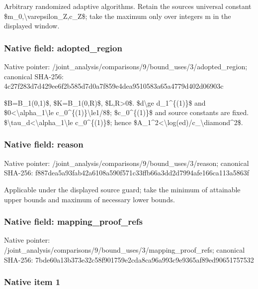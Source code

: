 \documentclass[10pt,a4paper]{article}
\begin{document}
Arbitrary randomized adaptive algorithms. Retain the sources universal constant \$m\_0,\textbackslash{}varepsilon\_Z,c\_Z\$; take the maximum only over integers m in the displayed window.


\subsubsection{Native field: adopted\_region}


Native pointer: /joint\_analysis/comparis\allowbreak{}ons/9/bound\_uses/3/adopt\allowbreak{}ed\_region; canonical SHA-256: 4c27f283d7d429ee6f2b585d\allowbreak{}7d0a7f859e4dea9510583a65\allowbreak{}a4779d402d06903c


\$B=B\_1(0,1)\$, \$K=B\_1(0,R)\$, \$L,R>0\$. \$d\textbackslash{}ge d\_1\textasciicircum{}\{(1)\}\$ and \$0<\textbackslash{}alpha\_1\textbackslash{}le c\_0\textasciicircum{}\{(1)\}\textbackslash{}le1/8\$; \$c\_0\textasciicircum{}\{(1)\}\$ and source constants are fixed. \$\textbackslash{}tau\_d<\textbackslash{}alpha\_1\textbackslash{}le c\_0\textasciicircum{}\{(1)\}\$; hence \$A\_1\textasciicircum{}2<\textbackslash{}log(ed)/c\_\textbackslash{}diamond\textasciicircum{}2\$.


\subsubsection{Native field: reason}


Native pointer: /joint\_analysis/comparis\allowbreak{}ons/9/bound\_uses/3/reaso\allowbreak{}n; canonical SHA-256: f887dea5a93fab42a6108a59\allowbreak{}0f571c33ffb66a3dd2d7994a\allowbreak{}fe166ca113a5863f


Applicable under the displayed source guard; take the minimum of attainable upper bounds and maximum of necessary lower bounds.


\subsubsection{Native field: mapping\_proof\_refs}


Native pointer: /joint\_analysis/comparis\allowbreak{}ons/9/bound\_uses/3/mappi\allowbreak{}ng\_proof\_refs; canonical SHA-256: 7bde60a13b373e32c58f9017\allowbreak{}59e2cda8ca96a993c9e9365a\allowbreak{}f89ed90651757532



\subsubsection{Native item 1}
\end{document}
